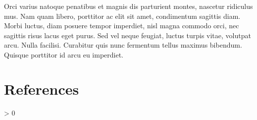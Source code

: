 \documentclass[
  english,
  man,floatsintext]{apa6}
\newlength{\cslhangindent}
\newenvironment{CSLReferences}[2] %
 {%
  \setlength{\parindent}{0pt}
  \ifodd #1 \everypar{\setlength{\hangindent}{\cslhangindent}}\ignorespaces\fi
  \ifnum #2 > 0
  \setlength{\parskip}{#2\baselineskip}
  \fi
 }%
 {}
\begin{document}
Orci varius natoque penatibus et magnis dis parturient montes, nascetur ridiculus mus. Nam quam libero, porttitor ac elit sit amet, condimentum sagittis diam. Morbi luctus, diam posuere tempor imperdiet, nisl magna commodo orci, nec sagittis risus lacus eget purus. Sed vel neque feugiat, luctus turpis vitae, volutpat arcu. Nulla facilisi. Curabitur quis nunc fermentum tellus maximus bibendum. Quisque porttitor id arcu eu imperdiet.

\newpage

\hypertarget{references}{%
\section{References}\label{references}}

\begingroup
\setlength{\parindent}{-0.5in}
\setlength{\leftskip}{0.5in}

\hypertarget{refs}{}
\begin{CSLReferences}{0}{0}
\end{CSLReferences}

\endgroup
\end{document}
